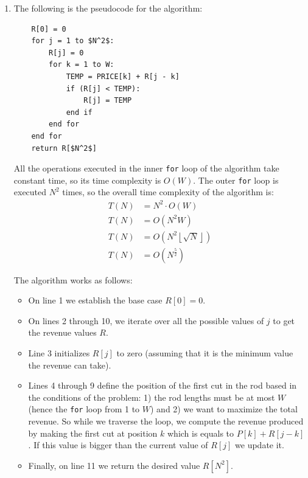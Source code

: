 \documentclass{article}
\begin{document}
\begin{enumerate}[1.]

    \item The following is the pseudocode for the algorithm:
\begin{lstlisting}
    R[0] = 0
    for j = 1 to $N^2$:
        R[j] = 0
        for k = 1 to W:
            TEMP = PRICE[k] + R[j - k]
            if (R[j] < TEMP):
                R[j] = TEMP
            end if
        end for
    end for
    return R[$N^2$]
\end{lstlisting}

    All the operations executed in the inner \texttt{for} loop of the algorithm take constant time, so its time complexity is $O(W)$. The outer \texttt{for} loop is executed $N^2$ times, so the overall time complexity of the algorithm is:
    \begin{align*}
        T(N) &= N^2 \cdot O(W)\\
        T(N) &= O(N^2W)\\
        T(N) &= O(N^2 \left \lfloor{\sqrt{N}}\right \rfloor)\\
        T(N) &= O(N^{\frac{5}{2}})
    \end{align*}
    
    The algorithm works as follows:
    \begin{itemize}
        \item On line 1 we establish the base case $R[0] = 0$.
        \item On lines 2 through 10, we iterate over all the possible values of $j$ to get the revenue values $R$.
        \item Line 3 initializes $R[j]$ to zero (assuming that it is the minimum value the revenue can take).
        \item Lines 4 through 9 define the position of the first cut in the rod based in the conditions of the problem: 1) the rod lengths must be at most $W$ (hence the \texttt{for} loop from 1 to $W$) and 2) we want to maximize the total revenue. So while we traverse the loop, we compute the revenue produced by making the first cut at position $k$ which is equals to $P[k] + R[j - k]$. If this value is bigger than the current value of $R[j]$ we update it.
        \item Finally, on line 11 we return the desired value $R[N^2]$.
    \end{itemize}
    

\end{enumerate}
\end{document}
